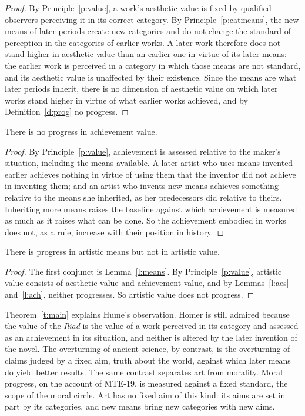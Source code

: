 \documentclass{situationist-preprint}
\begin{document}
\begin{proof}
By Principle~\ref{p:value}, a work's aesthetic value is fixed by qualified observers perceiving it in its correct category. By Principle~\ref{p:catmeans}, the new means of later periods create new categories and do not change the standard of perception in the categories of earlier works. A later work therefore does not stand higher in aesthetic value than an earlier one in virtue of its later means: the earlier work is perceived in a category in which those means are not standard, and its aesthetic value is unaffected by their existence. Since the means are what later periods inherit, there is no dimension of aesthetic value on which later works stand higher in virtue of what earlier works achieved, and by Definition~\ref{d:prog} no progress.
\end{proof}

\begin{lemma}\label{l:ach}
There is no progress in achievement value.
\end{lemma}

\begin{proof}
By Principle~\ref{p:value}, achievement is assessed relative to the maker's situation, including the means available. A later artist who uses means invented earlier achieves nothing in virtue of using them that the inventor did not achieve in inventing them; and an artist who invents new means achieves something relative to the means she inherited, as her predecessors did relative to theirs. Inheriting more means raises the baseline against which achievement is measured as much as it raises what can be done. So the achievement embodied in works does not, as a rule, increase with their position in history.
\end{proof}

\begin{theorem}\label{t:main}
There is progress in artistic means but not in artistic value.
\end{theorem}

\begin{proof}
The first conjunct is Lemma~\ref{l:means}. By Principle~\ref{p:value}, artistic value consists of aesthetic value and achievement value, and by Lemmas~\ref{l:aes} and~\ref{l:ach}, neither progresses. So artistic value does not progress.
\end{proof}

Theorem~\ref{t:main} explains Hume's observation. Homer is still admired because the value of the \emph{Iliad} is the value of a work perceived in its category and assessed as an achievement in its situation, and neither is altered by the later invention of the novel. The overturning of ancient science, by contrast, is the overturning of claims judged by a fixed aim, truth about the world, against which later means do yield better results. The same contrast separates art from morality. Moral progress, on the account of MTE-19, is measured against a fixed standard, the scope of the moral circle. Art has no fixed aim of this kind: its aims are set in part by its categories, and new means bring new categories with new aims.
\end{document}
